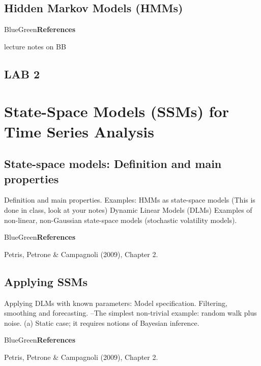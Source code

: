 \documentclass[dvipsnames,12pt]{book}
\begin{document}
    \chapter{Hidden Markov Models (HMMs)}

            \begin{mybox}{BlueGreen}{\textbf{References}}

                lecture notes on BB
                
            \end{mybox}

    \chapter*{LAB 2}

\part{State-Space Models (SSMs) for Time Series Analysis}

    \chapter[State-space models]{State-space models: Definition and main properties}

        Definition and main properties.
        Examples:
        HMMs as state-space models (This is done in class, look at your notes)
        Dynamic Linear Models (DLMs)
        Examples of non-linear, non-Gaussian state-space models (stochastic volatility models).

        \begin{mybox}{BlueGreen}{\textbf{References}}

            Petris, Petrone \& Campagnoli (2009), Chapter 2.
            
        \end{mybox}

    \chapter{Applying SSMs}

        Applying DLMs with known parameters:
        Model specification.
        Filtering, smoothing and forecasting.
        --The simplest non-trivial example: random walk plus noise. (a) Static case; it requires notions of Bayesian inference.

        \begin{mybox}{BlueGreen}{\textbf{References}}

            Petris, Petrone \& Campagnoli (2009), Chapter 2.
            
        \end{mybox}
\end{document}
